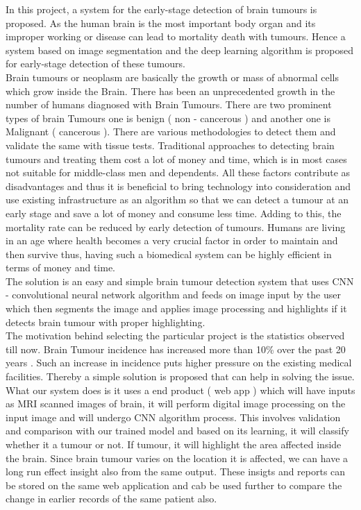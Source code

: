 {In this project, a system for the early-stage detection of brain tumours is proposed. As the human brain is the most important body organ and its improper working or disease can lead to mortality death with tumours. Hence a system based on image segmentation and the deep learning algorithm is proposed for early-stage detection of these tumours. }\\

{Brain tumours or neoplasm are basically the growth or mass of abnormal cells which grow inside the Brain. There has been an unprecedented growth in the number of humans diagnosed with Brain Tumours. There are two prominent types of brain Tumours one is benign ( non - cancerous ) and another one is Malignant ( cancerous ). There are various methodologies to detect them and validate the same with tissue tests. Traditional approaches to detecting brain tumours and treating them cost a lot of money and time, which is in most cases not suitable for middle-class men and dependents. All these factors contribute as disadvantages and thus it is beneficial to bring technology into consideration and use existing infrastructure as an algorithm so that we can detect a tumour at an early stage and save a lot of money and consume less time. Adding to this, the mortality rate can be reduced by early detection of tumours. Humans are living in an age where health becomes a very crucial factor in order to maintain and then survive thus, having such a biomedical system can be highly efficient in terms of money and time.}\\

{The solution is an easy and simple brain tumour detection system that uses CNN - convolutional neural network algorithm and feeds on image input by the user which then segments the image and applies image processing and highlights if it detects brain tumour with proper highlighting.}\\

{The motivation behind selecting the particular project is the statistics observed till now. Brain Tumour incidence has increased more than 10\% over the past 20 years \cite{ref5}. Such an increase in incidence puts higher pressure on the existing medical facilities. Thereby a simple solution is proposed that can help in solving the issue.}\\

{What our system does is it uses a end product ( web app ) which will have inputs as MRI scanned images of brain, it will perform digital image processing on the input image and will undergo CNN algorithm process. This involves validation and comparison with our trained model and based on its learning, it will classify whether it a tumour or not. If tumour, it will highlight the area affected inside the brain. Since brain tumour varies on the location it is affected, we can have a long run effect insight also from the same output. These insigts and reports can be stored on the same web application and cab be used further to compare the change in earlier records of the same patient also. }\\

